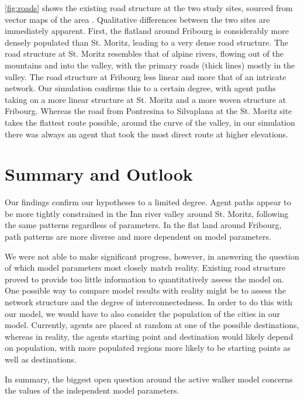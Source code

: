 \documentclass[a4paper, DIV11, abstracton]{scrartcl}
\begin{document}
\autoref{fig:roads} shows the existing road structure at the two study sites, sourced from vector maps of the area \citep{vector25}. Qualitative differences between the two sites are immediately apparent. First, the flatland around Fribourg is considerably more densely populated than St. Moritz, leading to a very dense road structure. The road structure at St. Moritz resembles that of alpine rivers, flowing out of the mountains and into the valley, with the primary roads (thick lines) mostly in the valley. The road structure at Fribourg less linear and more that of an intricate network. Our simulation confirms this to a certain degree, with agent paths taking on a more linear structure at St. Moritz and a more woven structure at Fribourg. Whereas the road from Pontresina to Silvaplana at the St. Moritz site takes the flattest route possible, around the curve of the valley, in our simulation there was always an agent that took the most direct route at higher elevations.





\section{Summary and Outlook}
Our findings confirm our hypotheses to a limited degree. Agent paths appear to be more tightly constrained in the Inn river valley around St. Moritz, following the same patterns regardless of parameters. In the flat land around Fribourg, path patterns are more diverse and more dependent on model parameters.

We were not able to make significant progress, however, in answering the question of which model parameters most closely match reality. Existing road structure proved to provide too little information to quantitatively assess the model on. One possible way to compare model results with reality might be to assess the network structure and the degree of interconnectedness. In order to do this with our model, we would have to also consider the population of the cities in our model. Currently, agents are placed at random at one of the possible destinations, whereas in reality, the agents starting point and destination would likely depend on population, with more populated regions more likely to be starting points as well as destinations.

In summary, the biggest open question around the active walker model concerns the values of the independent model parameters.
\end{document}
